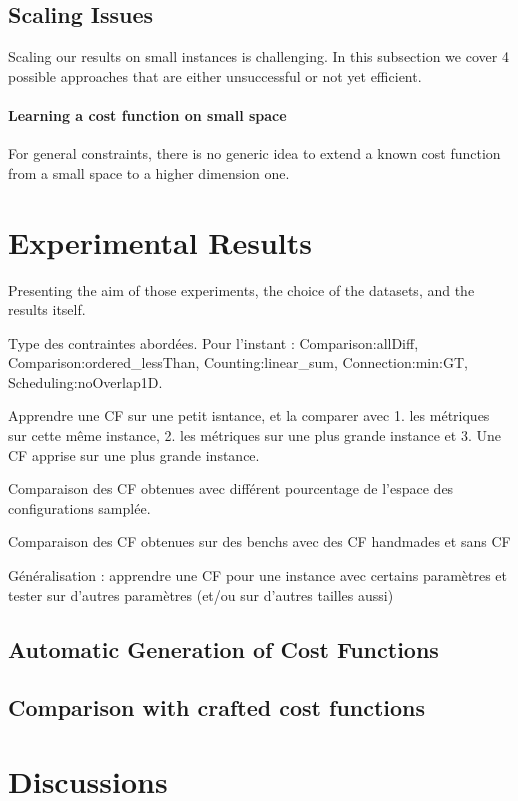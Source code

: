 \documentclass[letterpaper]{article} %
\begin{document}
\subsection{Scaling Issues}\label{subsec:issues}
Scaling our results on small instances is challenging. In this subsection we cover 4 possible approaches that are either unsuccessful or not yet efficient.

\paragraph{Learning a cost function on small space}
For general constraints, there is no generic idea to extend a known cost
function from a small space to a higher dimension one.

\section{Experimental Results}\label{sec:xp}
Presenting the aim of those experiments, the choice of the datasets, and the results itself.

Type des contraintes abordées. Pour l'instant : Comparison:allDiff, Comparison:ordered\_lessThan, Counting:linear\_sum, Connection:min:GT, Scheduling:noOverlap1D.

Apprendre une CF sur une petit isntance, et la comparer avec 1. les métriques sur cette même instance, 2. les métriques sur une plus grande instance et 3. Une CF apprise sur une plus grande instance.

Comparaison des CF obtenues avec différent pourcentage de l'espace des configurations samplée.

Comparaison des CF obtenues sur des benchs avec des CF handmades et sans CF

Généralisation : apprendre une CF pour une instance avec certains paramètres et tester sur d'autres paramètres (et/ou  sur d'autres tailles aussi)

\subsection{Automatic Generation of Cost Functions}
\label{subsec:xpgeneration}

\subsection{Comparison with crafted cost functions}\label{subsec:xpcomparison}

\section{Discussions}
\end{document}

